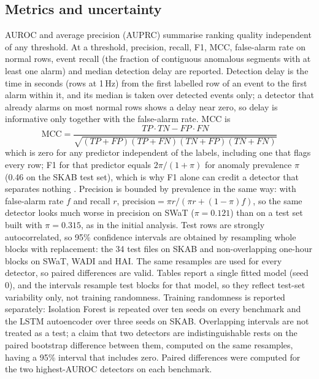 \documentclass[11pt]{article}
\begin{document}
\subsection{Metrics and uncertainty}
AUROC and average precision (AUPRC) summarise ranking quality independent of
any threshold. At a threshold, precision, recall, F1, MCC, false-alarm rate on
normal rows, event recall (the fraction of contiguous anomalous segments with at
least one alarm) and median detection delay are reported. Detection delay is the time in
seconds (rows at 1\,Hz) from the first labelled row of an event to the first alarm within
it, and its median is taken over detected events only; a detector that already alarms on
most normal rows shows a delay near zero, so delay is informative only together with the
false-alarm rate. MCC is
\begin{equation}
\mathrm{MCC}=\frac{TP\cdot TN-FP\cdot FN}{\sqrt{(TP+FP)(TP+FN)(TN+FP)(TN+FN)}}
\end{equation}
which is zero for any predictor independent of the labels, including one that
flags every row; F1 for that predictor equals $2\pi/(1+\pi)$ for anomaly
prevalence $\pi$ (0.46 on the SKAB test set), which is why F1 alone can credit
a detector that separates nothing \citep{chicco2020}. Precision is bounded by
prevalence in the same way: with false-alarm rate $f$ and recall $r$,
$\mathrm{precision}=\pi r/(\pi r+(1-\pi)f)$, so the same detector looks much
worse in precision on SWaT ($\pi{=}0.121$) than on a test set built with
$\pi{=}0.315$, as in the initial analysis.
Test rows are strongly autocorrelated, so 95\% confidence intervals are
obtained by resampling whole blocks with replacement: the 34 test files on SKAB
and non-overlapping one-hour blocks on SWaT, WADI and HAI. The same resamples are used for
every detector, so paired differences are valid. Tables report a single fitted model
(seed 0), and the intervals resample test blocks for that model, so they reflect test-set
variability only, not training randomness. Training randomness is reported separately:
Isolation Forest is repeated over ten seeds on every benchmark and the LSTM autoencoder
over three seeds on SKAB. Overlapping intervals are not treated as a test; a claim that two
detectors are indistinguishable rests on the paired bootstrap difference between them,
computed on the same resamples, having a 95\% interval that includes zero. Paired
differences were computed for the two highest-AUROC detectors on each benchmark.
\end{document}
